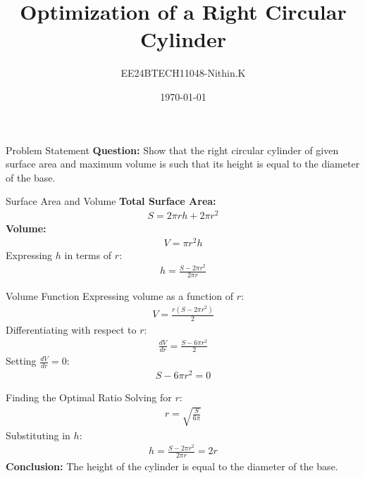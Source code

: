 \documentclass{beamer}
\title{Optimization of a Right Circular Cylinder}
\author{EE24BTECH11048-Nithin.K}
\date{\today}
\begin{document}
\frame{\titlepage}

\begin{frame}{Problem Statement}
    \textbf{Question:} \newline
    Show that the right circular cylinder of given surface area and maximum volume is such that its height is equal to the diameter of the base.
\end{frame}

\begin{frame}{Surface Area and Volume}
    \textbf{Total Surface Area:}
    \begin{align}
        S = 2\pi rh + 2\pi r^2
    \end{align}
    \textbf{Volume:}
    \begin{align}
        V = \pi r^2h
    \end{align}
    Expressing $h$ in terms of $r$:
    \begin{align}
        h = \frac{S - 2\pi r^2}{2\pi r}
    \end{align}
\end{frame}

\begin{frame}{Volume Function}
    Expressing volume as a function of $r$:
    \begin{align}
        V = \frac{r(S - 2\pi r^2)}{2}
    \end{align}
    Differentiating with respect to $r$:
    \begin{align}
        \frac{dV}{dr} = \frac{S - 6\pi r^2}{2}
    \end{align}
    Setting $\frac{dV}{dr} = 0$:
    \begin{align}
        S - 6\pi r^2 = 0
    \end{align}
\end{frame}

\begin{frame}{Finding the Optimal Ratio}
    Solving for $r$:
    \begin{align}
        r = \sqrt{\frac{S}{6\pi}}
    \end{align}
    Substituting in $h$:
    \begin{align}
        h = \frac{S - 2\pi r^2}{2\pi r} = 2r
    \end{align}
    \textbf{Conclusion:} The height of the cylinder is equal to the diameter of the base.
\end{frame}
\end{document}
